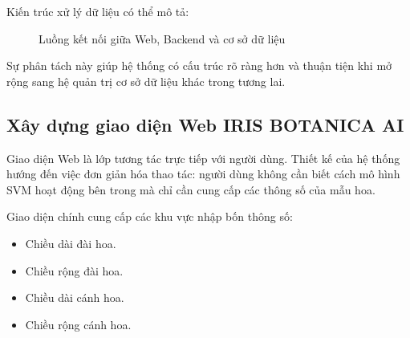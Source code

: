 \documentclass[14pt]{extarticle}
\begin{document}
	\noindent Kiến trúc xử lý dữ liệu có thể mô tả:
	
\begin{figure}[htbp]
	\centering
	\caption{Luồng kết nối giữa Web, Backend và cơ sở dữ liệu}
	\label{fig:database-flow}
\end{figure}


	
	\noindent Sự phân tách này giúp hệ thống có cấu trúc rõ ràng hơn và thuận tiện khi mở rộng sang hệ quản trị cơ sở dữ liệu khác trong tương lai.
	
	\subsection{Xây dựng giao diện Web IRIS BOTANICA AI}
	
	\noindent Giao diện Web là lớp tương tác trực tiếp với người dùng. Thiết kế của hệ thống hướng đến việc đơn giản hóa thao tác: người dùng không cần biết cách mô hình SVM hoạt động bên trong mà chỉ cần cung cấp các thông số của mẫu hoa.
	
	\noindent Giao diện chính cung cấp các khu vực nhập bốn thông số:
	
	\begin{itemize}[leftmargin=*]
		\item Chiều dài đài hoa.
		\item Chiều rộng đài hoa.
		\item Chiều dài cánh hoa.
		\item Chiều rộng cánh hoa.
	\end{itemize}
	
\end{document}

